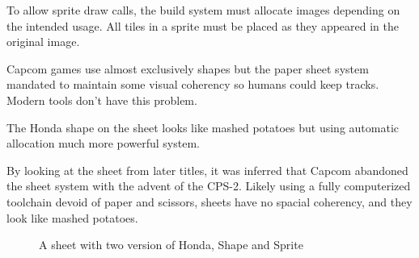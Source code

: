 To allow sprite draw calls, the build system must allocate images depending on the intended usage. All tiles in a sprite must be placed as they appeared in the original image.
 

Capcom games use almost exclusively shapes but the paper sheet system mandated to maintain some visual coherency so humans could keep tracks. Modern tools don't have this problem. 

The Honda shape on the sheet looks like mashed potatoes but using automatic allocation much more powerful system.

\begin{trivia}
By looking at the sheet from later titles, it was inferred that Capcom abandoned the sheet system with the advent of the CPS-2. Likely using a fully computerized toolchain devoid of paper and scissors, sheets have no spacial coherency, and they look like mashed potatoes.
\end{trivia}

\begin{figure}[H]
\caption*{A sheet with two version of Honda, Shape and Sprite}
\end{figure}






